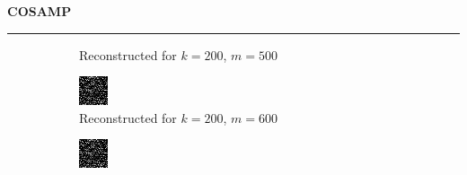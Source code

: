 \documentclass[a4paper,12pt]{article}
\newenvironment{solution}[2][]{%
    \begin{mdframed}[linecolor=blue!70!black, linewidth=2pt, roundcorner=10pt, backgroundcolor=yellow!10!white, skipabove=12pt, skipbelow=12pt]%
        \textbf{\large #2}
        \par\noindent\rule{\textwidth}{0.4pt}
}{
    \end{mdframed}
}
\begin{document}
\begin{solution}{COSAMP}
\begin{figure}[H]
\begin{subfigure}[t]{0.23\textwidth}
            \caption{Reconstructed for $k = 200$, $m = 500$}
        \end{subfigure}
        \begin{subfigure}[t]{0.23\textwidth}
            \centering
            \includegraphics[width=\textwidth]{../images/cosamp/Reconstructed_k_200_m_600.png}
            \caption{Reconstructed for $k = 200$, $m = 600$}
        \end{subfigure}
        \begin{subfigure}[t]{0.23\textwidth}
            \centering
            \includegraphics[width=\textwidth]{../images/cosamp/Reconstructed_k_200_m_700.png}

\end{subfigure}
\end{figure}
\end{solution}
\end{document}
